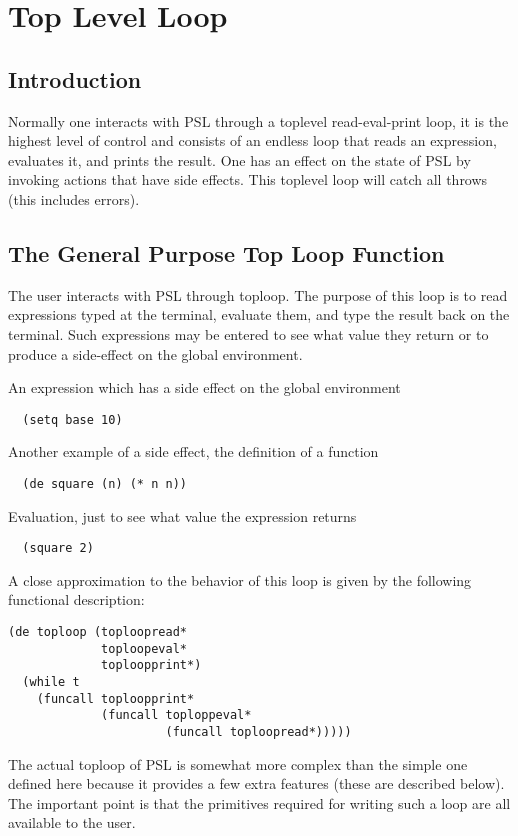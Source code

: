 \chapter*{Top Level Loop}


\section{Introduction}

  Normally   one   interacts   with   PSL   through  a  toplevel
read-eval-print loop, it is the highest  level  of  control  and
consists  of an endless loop that reads an expression, evaluates
it, and prints the result.  One has an effect on  the  state  of
PSL  by  invoking actions that have side effects.  This toplevel
loop will catch all throws (this includes errors).

\section{The General Purpose Top Loop Function}

  The user interacts with PSL through toploop.  The  purpose  of
this loop is to read expressions typed at the terminal, evaluate
them,   and  type  the  result  back  on  the  terminal.    Such
expressions may be entered to see what value they return  or  to
produce a side-effect on the global environment.

An expression which has a side effect on the global environment
\begin{verbatim}
  (setq base 10)
\end{verbatim}
Another example of a side effect, the definition of a function
\begin{verbatim}
  (de square (n) (* n n))
\end{verbatim}
Evaluation, just to see what value the expression returns
\begin{verbatim}
  (square 2)
\end{verbatim}
A  close  approximation to the behavior of this loop is given by
the following functional description:

\begin{verbatim}
(de toploop (toploopread*
             toploopeval*
             toploopprint*)
  (while t
    (funcall toploopprint*
             (funcall toploppeval*
                      (funcall toploopread*)))))
\end{verbatim}
The actual toploop of PSL is  somewhat  more  complex  than  the
simple one defined here because it provides a few extra features
(these  are  described  below).  The important point is that the
primitives required for writing such a loop are all available to
the user.

